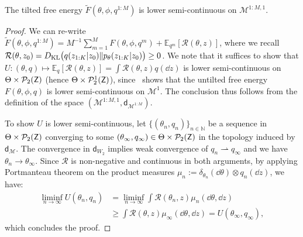 \begin{lemma}\label{lem:lower_semi_continuous}
    The tilted free energy $\tilde{F}(\theta, \phi, q^{1:M})$ is lower semi-continuous on $\mathcal{M}^{1:M,1}$.
\end{lemma}
\begin{proof}
    We can re-write $\tilde{F}(\theta, \phi, q^{1:M}) = M^{-1}\sum_{m=1}^M {F}(\theta, \phi, q^m)+\mathbb{E}_{q^m}[\mathcal{R}(\theta, z)]$, where we recall $\mathcal{R}(\theta, z_0) = D_{\mathrm{KL}}\big(q(z_{1:K}|z_{0}) \|p_{\theta}(z_{1:K}|z_{0})\big) \geq 0$.
    We note that it suffices to show that $U: (\theta, q) \mapsto \mathbb{E}_{q}[\mathcal{R}(\theta, z)] = \int \mathcal{R}(\theta, z) q(\dd z)$ is lower semi-continuous on $\Theta \times \mathcal{P}_2({\mathsf{Z}})$ (hence $\Theta \times \mathcal{P}_2^1({\mathsf{Z}})$), since~\citet[Lemma 18]{caprioerrorboundsparticle2024} shows that the untilted free energy ${F}(\theta, \phi, q)$ is lower semi-continuous on $\mathcal{M}^1$. The conclusion thus follows from the definition of the space $(\mathcal{M}^{1:M,1}, \mathsf{d}_{\mathcal{M}^{1:M}})$.

    To show $U$ is lower semi-continuous, let $\{(\theta_n, q_n)\}_{n\in\mathbb{N}}$ be a sequence in $\Theta \times \mathcal{P}_2({\mathsf{Z}})$ converging to some $(\theta_\infty, q_\infty) \in \Theta \times \mathcal{P}_2({\mathsf{Z}})$ in the topology induced by $\mathsf{d}_{\mathcal{M}}$. The convergence in $\mathsf{d}_{W_2}$ implies weak convergence of $q_n \rightharpoonup q_\infty$ \citep{figalli2021invitation} and we have $\theta_n \to \theta_\infty$.
    Since $\mathcal{R}$ is non-negative and continuous in both arguments, by applying Portmanteau theorem on the product measures $\mu_n:=\delta_{\theta_n}(\dd \theta) \otimes q_n(\dd z)$,
    we have:
    \begin{align*}
        \liminf_{n\to\infty} U(\theta_n, q_n) &= \liminf_{n\to\infty} \int \mathcal{R}(\theta_n, z) \mu_n(\dd \theta, \dd z)\\
        &\geq\int \mathcal{R}(\theta, z) \mu_\infty(\dd \theta, \dd z) = U(\theta_\infty, q_\infty),
    \end{align*}
    which concludes the proof.
\end{proof}

